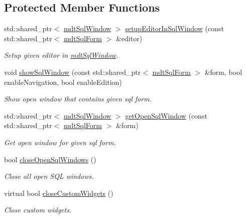 \subsection*{Protected Member Functions}
\begin{DoxyCompactItemize}
\item 
std\-::shared\-\_\-ptr$<$ \hyperlink{classmdt_sql_window}{mdt\-Sql\-Window} $>$ \hyperlink{classmdt_sql_application_widgets_a2842fabf25ecd8ecb40d52825fcca630}{setup\-Editor\-In\-Sql\-Window} (const std\-::shared\-\_\-ptr$<$ \hyperlink{classmdt_sql_form}{mdt\-Sql\-Form} $>$ \&editor)
\begin{DoxyCompactList}\small\item\em Setup given editor in \hyperlink{classmdt_sql_window}{mdt\-Sql\-Window}. \end{DoxyCompactList}\item 
void \hyperlink{classmdt_sql_application_widgets_a57b205891e1658af5c078d5415f04631}{show\-Sql\-Window} (const std\-::shared\-\_\-ptr$<$ \hyperlink{classmdt_sql_form}{mdt\-Sql\-Form} $>$ \&form, bool enable\-Navigation, bool enable\-Edition)
\begin{DoxyCompactList}\small\item\em Show open window that contains given sql form. \end{DoxyCompactList}\item 
std\-::shared\-\_\-ptr$<$ \hyperlink{classmdt_sql_window}{mdt\-Sql\-Window} $>$ \hyperlink{classmdt_sql_application_widgets_aa9a25fc1cd8f7e6ab520f1eebbc4cba9}{get\-Open\-Sql\-Window} (const std\-::shared\-\_\-ptr$<$ \hyperlink{classmdt_sql_form}{mdt\-Sql\-Form} $>$ \&form)
\begin{DoxyCompactList}\small\item\em Get open window for given sql form. \end{DoxyCompactList}\item 
bool \hyperlink{classmdt_sql_application_widgets_aa7083c0c32880cb9f8919136fc5900cf}{close\-Open\-Sql\-Windows} ()
\begin{DoxyCompactList}\small\item\em Close all open S\-Q\-L windows. \end{DoxyCompactList}\item 
virtual bool \hyperlink{classmdt_sql_application_widgets_a811fccddb41cb47b6c49243e1b83f270}{close\-Custom\-Widgets} ()
\begin{DoxyCompactList}\small\item\em Close custom widgets. \end{DoxyCompactList}\item 

\end{DoxyCompactItemize}
